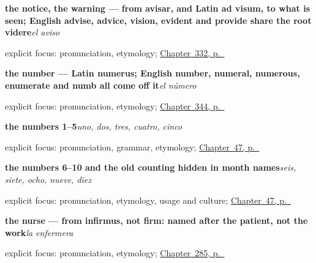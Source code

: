 \noindent\begin{minipage}[t]{\linewidth}
\raggedright
\textbf{the notice, the warning — from avisar, and Latin ad visum, to what is seen; English advise, advice, vision, evident and provide share the root videre}\enspace\emph{el aviso}\par
\footnotesize explicit focus: pronunciation, etymology; \hyperref[ch:permiso-y-voz]{Chapter~332, p.~\pageref*{ch:permiso-y-voz}}
\end{minipage}\par\smallskip

\noindent\begin{minipage}[t]{\linewidth}
\raggedright
\textbf{the number — Latin numerus; English number, numeral, numerous, enumerate and numb all come off it}\enspace\emph{el número}\par
\footnotesize explicit focus: pronunciation, etymology; \hyperref[ch:cero-y-mitad]{Chapter~344, p.~\pageref*{ch:cero-y-mitad}}
\end{minipage}\par\smallskip

\noindent\begin{minipage}[t]{\linewidth}
\raggedright
\textbf{the numbers 1–5}\enspace\emph{uno, dos, tres, cuatro, cinco}\par
\footnotesize explicit focus: pronunciation, grammar, etymology; \hyperref[ch:numbers-and-age]{Chapter~47, p.~\pageref*{ch:numbers-and-age}}
\end{minipage}\par\smallskip

\noindent\begin{minipage}[t]{\linewidth}
\raggedright
\textbf{the numbers 6–10 and the old counting hidden in month names}\enspace\emph{seis, siete, ocho, nueve, diez}\par
\footnotesize explicit focus: pronunciation, etymology, usage and culture; \hyperref[ch:numbers-and-age]{Chapter~47, p.~\pageref*{ch:numbers-and-age}}
\end{minipage}\par\smallskip

\noindent\begin{minipage}[t]{\linewidth}
\raggedright
\textbf{the nurse — from infirmus, not firm: named after the patient, not the work}\enspace\emph{la enfermera}\par
\footnotesize explicit focus: pronunciation, etymology; \hyperref[ch:quien-es]{Chapter~285, p.~\pageref*{ch:quien-es}}
\end{minipage}\par\smallskip

